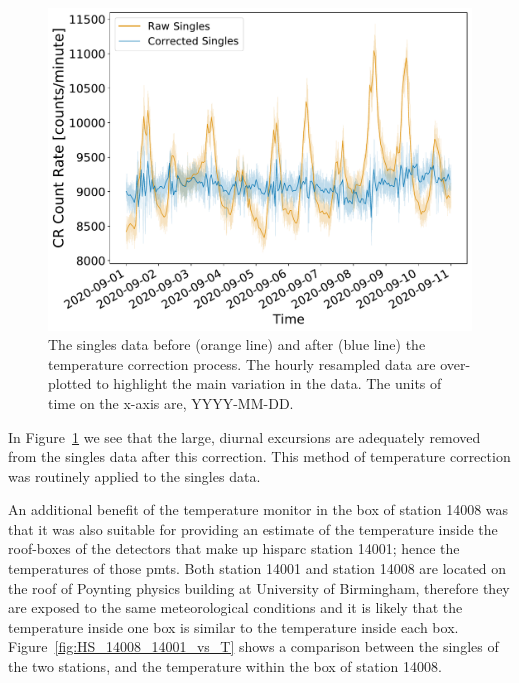 \begin{figure}[ht!]
	\centering
	\includegraphics[width=0.6\columnwidth]{raw_vs_corrected_singles_copy2.pdf}
	\caption{The singles data before (orange line) and after (blue line) the temperature correction process. The hourly resampled data are over-plotted to highlight the main variation in the data. The units of time on the x-axis are, YYYY-MM-DD.}
	\label{fig:HS_14008_corrected_singles}
\end{figure}

In Figure~\ref{fig:HS_14008_corrected_singles} we see that the large, diurnal excursions are adequately removed from the singles data after this correction. This method of temperature correction was routinely applied to the singles data. %


An additional benefit of the temperature monitor in the box of station 14008 was that it was also suitable for providing an estimate of the temperature inside the roof-boxes of the detectors that make up \gls{hisparc} station 14001; hence the temperatures of those \glspl{pmt}. Both station 14001 and station 14008 are located on the roof of Poynting physics building at University of Birmingham, therefore they are exposed to the same meteorological conditions and it is likely that the temperature inside one box is similar to the temperature inside each box. Figure~\ref{fig:HS_14008_14001_vs_T} shows a comparison between the singles of the two stations, and the temperature within the box of station 14008.


